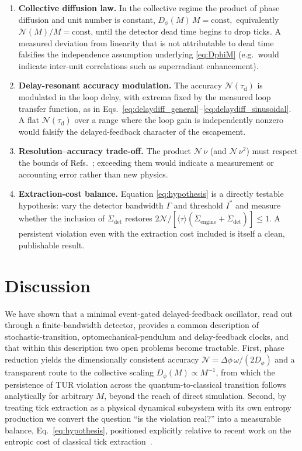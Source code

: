 \documentclass[aps,pre,reprint,amsmath,amssymb,floatfix,nofootinbib]{revtex4-2}
\newcommand{\avg}[1]{\langle #1 \rangle}
\newcommand{\Sdot}{\dot{\Sigma}}
\newcommand{\Dphi}{D_{\phi}}
\newcommand{\taud}{\tau_{\mathrm{d}}}
\begin{document}
\begin{enumerate}
\item \textbf{Collective diffusion law.}
In the collective regime the product of phase diffusion and unit number
is constant,
\(
  \Dphi(M)\,M = \mathrm{const},
\)
equivalently $\mathcal{N}(M)/M=\mathrm{const}$, until the detector dead
time begins to drop ticks. A measured deviation from linearity that is
not attributable to dead time falsifies the independence assumption
underlying \eqref{eq:DphiM} (e.g.\ would indicate inter-unit
correlations such as superradiant enhancement).

\item \textbf{Delay-resonant accuracy modulation.}
The accuracy $\mathcal{N}(\taud)$ is modulated in the loop
delay, with extrema fixed by the measured loop transfer function, as in
Eqs.~\eqref{eq:delaydiff_general}--\eqref{eq:delaydiff_sinusoidal}. A flat $\mathcal{N}(\taud)$ over a range where the loop gain is independently nonzero would falsify the
delayed-feedback character of the escapement.

\item \textbf{Resolution--accuracy trade-off.}
The product $\mathcal{N}\,\nu$ (and $\mathcal{N}\,\nu^2$) must respect the
bounds of Refs.~\cite{Meier2023,Prech2025}; exceeding them would indicate
a measurement or accounting error rather than new physics.

\item \textbf{Extraction-cost balance.}
Equation \eqref{eq:hypothesis} is a directly testable hypothesis: vary
the detector bandwidth $\Gamma$ and threshold $I^\ast$ and measure
whether the inclusion of $\Sdot_{\mathrm{det}}$ restores
$2\mathcal{N}/[\avg{\tau}(\Sdot_{\mathrm{engine}}+\Sdot_{\mathrm{det}})]\le1$.
A persistent violation even with the extraction cost included is itself a
clean, publishable result.
\end{enumerate}

\section{Discussion}
\label{sec:discussion}

We have shown that a minimal event-gated delayed-feedback oscillator,
read out through a finite-bandwidth detector, provides a common
description of stochastic-transition, optomechanical-pendulum and
delay-feedback clocks, and that within this description two open problems
become tractable. First, phase reduction yields the dimensionally consistent accuracy
$\mathcal{N}=\Delta\phi\,\omega/(2\Dphi)$ and a transparent route to the
collective scaling $\Dphi(M)\propto M^{-1}$, from which the persistence
of TUR violation across the quantum-to-classical transition follows
analytically for arbitrary $M$, beyond the reach of direct simulation.
Second, by treating tick extraction as a physical dynamical subsystem
with its own entropy production we convert the question ``is the
violation real?'' into a measurable balance, Eq.~\eqref{eq:hypothesis},
positioned explicitly relative to recent work on the entropic cost of
classical tick extraction~\cite{Wadhia2025}.
\end{document}
